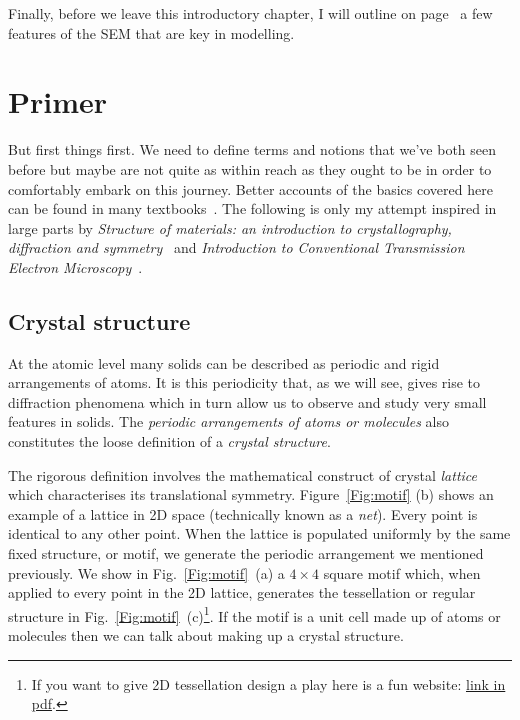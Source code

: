 Finally, before we leave this introductory chapter, I will outline on page~\pageref{sec:sem} a few features of the SEM that are key in modelling. 


\section{Primer}
But first things first. We need to define terms and notions that we've both seen before but maybe are not quite as within reach as they ought to be in order to comfortably embark on this journey. Better accounts of the basics covered here can be found in many textbooks~\cite{Hirsch11,Williams96,Reimer13}. The following is only my attempt inspired in large parts by \textit{Structure of materials: an introduction to crystallography, diffraction and symmetry}~\cite{SoM} and \textit{Introduction to Conventional Transmission Electron Microscopy}~\cite{MarcTEM03}.

\subsection{Crystal structure}
\label{Sec:crystalStruct}
At the atomic level many solids can be described as periodic and rigid arrangements of atoms. It is this periodicity that, as we will see, gives rise to diffraction phenomena which in turn allow us to observe and study very small features in solids. The \textit{periodic arrangements of atoms or molecules} also constitutes the loose definition of a \textit{crystal structure}.

The rigorous definition involves the mathematical construct of crystal \textit{lattice} which characterises its translational symmetry. Figure~\ref{Fig:motif} (b) shows an example of a lattice in 2D space (technically known as a \textit{net}). Every point is identical to any other point. When the lattice is populated uniformly by the same fixed structure, or motif, we generate the periodic arrangement we mentioned previously. We show in Fig.~\ref{Fig:motif}~(a) a $4\times4$ square motif which, when applied to every point in the 2D lattice, generates the tessellation or regular structure in Fig.~\ref{Fig:motif}~(c)\footnote{If you want to give 2D tessellation design a play here is a fun website: \href{http://gwydir.demon.co.uk/jo/tess/tess.htm}{link in pdf}.}. If the motif is a unit cell made up of atoms or molecules then we can talk about making up a crystal structure. 


